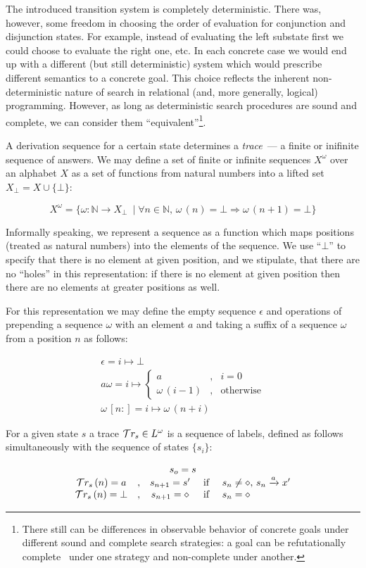 The introduced transition system is completely deterministic. There was, however, some freedom in choosing the order of evaluation for conjunction and
disjunction states. For example, instead of evaluating the left substate first we could choose to evaluate the right one, etc. In each concrete case we would
end up with a different (but still deterministic) system which would prescribe different semantics to a concrete goal. This choice reflects the inherent
non-deterministic nature of search in relational (and, more generally, logical) programming. However, as long as deterministic search procedures
are sound and complete, we can consider them ``equivalent''\footnote{There still can be differences in observable behavior of concrete goals under different
sound and complete search strategies: a goal can be refutationally complete~\cite{WillThesis} under one strategy and non-complete under another.}.

A derivation sequence for a certain state determines a \emph{trace}~--- a finite or inifinite sequence of answers. We may define a set of finite or infinite
sequences $X^\omega$ over an alphabet $X$ as a set of functions from natural numbers into a lifted set $X_\bot=X\cup\{\bot\}$:

\[
X^\omega=\{\omega : \mathbb{N}\to X_\bot\ \mid \forall n\in\mathbb{N},\, \omega\,(n)=\bot\Rightarrow \omega\,(n+1)=\bot\}
\]

Informally speaking, we represent a sequence as a function which maps positions (treated as natural numbers) into the elements of the sequence. We use ``$\bot$''
to specify that there is no element at given position, and we stipulate, that there are no ``holes'' in this representation: if there is no element at given
position then there are no elements at greater positions as well. 

For this representation we may define the empty sequence $\epsilon$ and operations of prepending a sequence $\omega$ with an element $a$ and taking a suffix of
a sequence $\omega$ from a position $n$ as follows:

\begin{gather*}
  \epsilon = i \mapsto \bot\\[2mm]
  a\omega = i \mapsto \left\{
  \begin{array}{rcl}
    a &,& i = 0\\
    \omega\,(i-1)&,&\mbox{otherwise}
  \end{array}
  \right.\\[2mm]
  \omega\,[n:]=i\mapsto\omega\,(n+i)
\end{gather*}

For a given state $s$ a trace $\mathcal{T}r_{s}\in L^\omega$ is a sequence of labels, defined as follows simultaneously with the sequence of states $\{s_i\}$:

\[
\begin{array}{ccccl}
  \multicolumn{5}{c}{s_o=s}\\
  \tr{s}\,(n)=a &,& s_{n+1}=s'&\mbox{ if }& s_n\ne\diamond,\, s_n\xrightarrow{a} x'\\
  \tr{s}\,(n)=\bot&,&s_{n+1}=\diamond&\mbox{ if }& s_n=\diamond
\end{array}
\]

